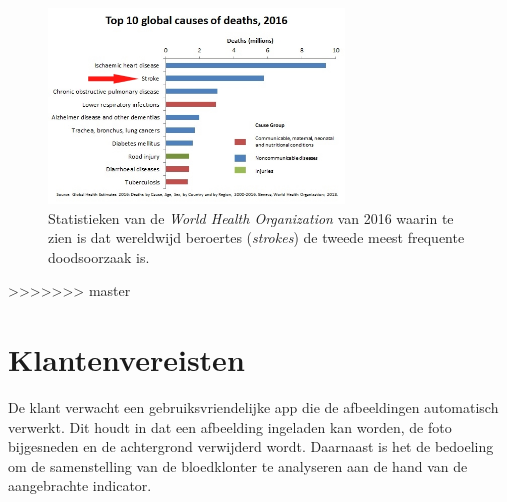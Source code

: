 \documentclass[a4paper,kulak]{kulakarticle}
\begin{document}
	\begin{figure}[H]
		\centering
		\includegraphics[width = 0.7\textwidth]{top10doodsoorzaken.png}
	
		\caption{Statistieken van de \textit{World Health Organization} van 2016 waarin te zien is dat wereldwijd beroertes (\textit{strokes}) de tweede meest frequente doodsoorzaak is.}
		\label{figuur doodsoorzaken}
	\end{figure}

\pagebreak
\newpage

\tableofcontents

\newpage
>>>>>>> master

\section{Klantenvereisten}
De klant verwacht een gebruiksvriendelijke app die de afbeeldingen automatisch verwerkt. Dit houdt in dat een afbeelding ingeladen kan worden, de foto bijgesneden en de achtergrond verwijderd wordt. Daarnaast is het de bedoeling om de samenstelling van de bloedklonter te analyseren aan de hand van de aangebrachte indicator.
\end{document}
